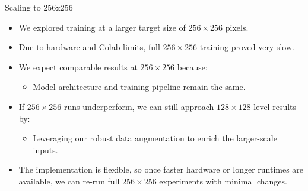 \begin{frame}{Scaling to 256x256}
    \begin{itemize}
        \item We explored training at a larger target size of $256\times256$ pixels.
        \item Due to hardware and Colab limits, full $256\times256$ training proved very slow.
        \item We expect comparable results at $256\times256$ because:
            \begin{itemize}
                \item Model architecture and training pipeline remain the same.
            \end{itemize}
        \item If $256\times256$ runs underperform, we can still approach $128\times128$-level results by:
            \begin{itemize}
                \item Leveraging our robust data augmentation to enrich the larger-scale inputs.
            \end{itemize}
        \item The implementation is flexible, so once faster hardware or longer runtimes are available, we can re-run full $256\times256$ experiments with minimal changes.
    \end{itemize}
\end{frame}
